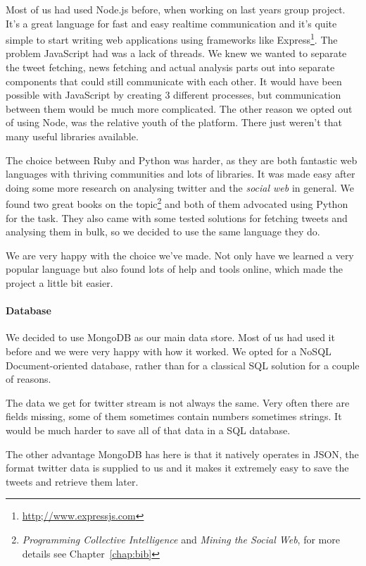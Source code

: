 \documentclass{report}
\begin{document}
		Most of us had used Node.js before, when working on last years group project. It's a great language for fast and easy realtime communication and it's quite simple to start writing web applications using frameworks like Express\footnote{\url{http;//www.expressjs.com}}. The problem JavaScript had was a lack of threads. We knew we wanted to separate the tweet fetching, news fetching and actual analysis parts out into separate components that could still communicate with each other. It would have been possible with JavaScript by creating 3 different processes, but communication between them would be much more complicated. The other reason we opted out of using Node, was the relative youth of the platform. There just weren't that many useful libraries available.
		
		The choice between Ruby and Python was harder, as they are both fantastic web languages with thriving communities and lots of libraries. It was made easy after doing some more research on analysing twitter and the \emph{social web} in general. We found two great books on the topic\footnote{\emph{Programming Collective Intelligence} and \emph{Mining the Social Web}, for more details see Chapter~\ref{chap:bib}} and both of them advocated using Python for the task. They also came with some tested solutions for fetching tweets and analysing them in bulk, so we decided to use the same language they do.
		
		We are very happy with the choice we've made. Not only have we learned a very popular language but also found lots of help and tools online, which made the project a little bit easier. 
		
		\paragraph{Database} We decided to use MongoDB as our main data store. Most of us had used it before and we were very happy with how it worked. We opted for a NoSQL Document-oriented database, rather than for a classical SQL solution for a couple of reasons.
		
		The data we get for twitter stream is not always the same. Very often there are fields missing, some of them sometimes contain numbers sometimes strings. It would be much harder to save all of that data in a SQL database.
		
		The other advantage MongoDB has here is that it natively operates in JSON, the format twitter data is supplied to us and it makes it extremely easy to save the tweets and retrieve them later.
		
\end{document}
